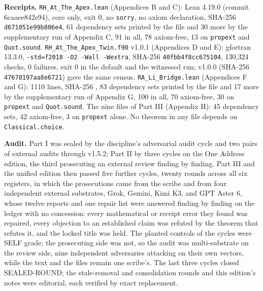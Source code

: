 \documentclass[10pt]{article}
\begin{document}
\textbf{Receipts.} \texttt{RH\_At\_The\_Apex.lean} (Appendices B and C):
Lean 4.19.0 (commit 6caaee842e94), core only, exit 0, no \texttt{sorry},
no axiom declaration, SHA-256 \texttt{d671051e99b806e4}, 61 dependency
sets printed by the file and 30 more by the supplementary run of
Appendix C, 91 in all, 78 axiom-free, 13 on \texttt{propext} and
\texttt{Quot.sound}. \texttt{RH\_At\_The\_Apex\_Twin.f90} v1.0.1
(Appendices D and E): gfortran 13.3.0,
\texttt{-std=f2018 -O2 -Wall -Wextra}, SHA-256
\texttt{40fbb4f8cc675104}, 130,324 checks, 0 failures, exit 0 in the
default and the witnessed run; v1.0.0 (SHA-256
\texttt{47670197aa8e6721}) gave the same census.
\texttt{RA\_Li\_Bridge.lean} (Appendices F and G): 1110 lines, SHA-256
\texttt{},
83 dependency sets printed by the file and 17 more by the supplementary
run of Appendix G, 100 in all, 70 axiom-free, 30 on \texttt{propext} and
\texttt{Quot.sound}. The nine files of Part III (Appendix H): 45
dependency sets, 42 axiom-free, 3 on \texttt{propext} alone. No theorem
in any file depends on \texttt{Classical.choice}.

\textbf{Audit.} Part I was sealed by the discipline's adversarial audit
cycle and two pairs of external audits through v1.5.2; Part II by three
cycles on the One Address edition, the third prosecuting an external
review finding by finding. Part III and the unified edition then passed
five further cycles, twenty rounds across all six registers, in which
the prosecutions came from the scribe and from four independent external
substrates, Grok, Gemini, Kimi K3, and GPT Aster 6, whose twelve reports
and one repair list were answered finding by finding on the ledger with
no concession: every mathematical or receipt error they found was
repaired, every objection to an established claim was refuted by the
theorem that refutes it, and the locked title was held. The planted
controls of the cycles were SELF grade; the prosecuting side was not, so
the audit was multi-substrate on the review side, nine independent
adversaries attacking on their own vectors, while the text and the files
remain one scribe's. The last three cycles closed SEALED-ROUND; the
stale-removal and consolidation rounds and this edition's notes were
editorial, each verified by exact replacement.
\end{document}

